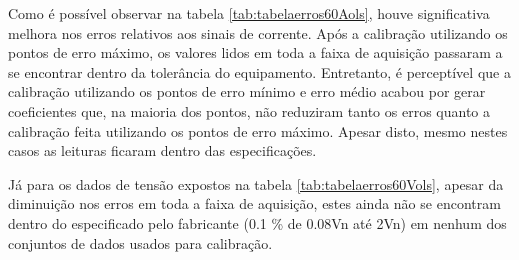 \begin{table}[H]
\end{table}

Como é possível observar na tabela \ref{tab:tabelaerros60Aols}, houve significativa melhora nos erros relativos aos sinais de corrente. Após a calibração utilizando os pontos de erro máximo, os valores lidos em toda a faixa de aquisição passaram a se encontrar dentro da tolerância do equipamento. Entretanto, é perceptível que a calibração utilizando os pontos de erro mínimo e erro médio acabou por gerar coeficientes que, na maioria dos pontos, não reduziram tanto os erros quanto a calibração feita utilizando os pontos de erro máximo. Apesar disto, mesmo nestes casos as leituras ficaram dentro das especificações.

Já para os dados de tensão expostos na tabela \ref{tab:tabelaerros60Vols}, apesar da diminuição nos erros em toda a faixa de aquisição, estes ainda não se encontram dentro do especificado pelo fabricante (0.1 \% de 0.08Vn até 2Vn) em nenhum dos conjuntos de dados usados para calibração.

